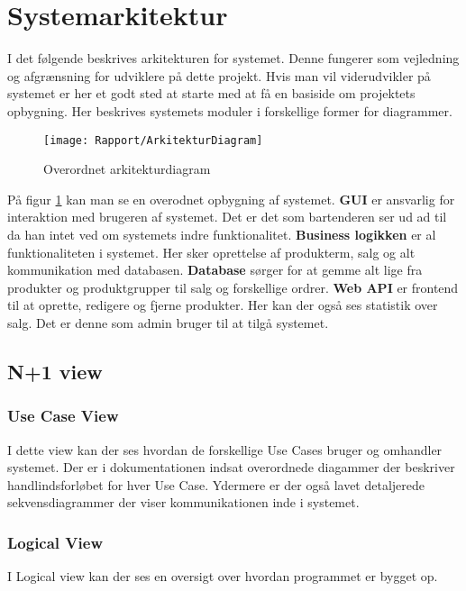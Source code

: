 \section{Systemarkitektur}

I det følgende beskrives arkitekturen for systemet. Denne fungerer som vejledning og afgrænsning for udviklere på dette projekt. Hvis man vil viderudvikler på systemet er her et godt sted at starte med at få en basiside om projektets opbygning.\newline
Her beskrives systemets moduler i forskellige former for diagrammer. 

\begin{figure}[H]
	\centering
	\texttt{[image: Rapport/ArkitekturDiagram]}
	\caption{Overordnet arkitekturdiagram}
	\label{ArkiDia}
\end{figure}

På figur \ref{ArkiDia} kan man se en overodnet opbygning af systemet. \textbf{GUI} er ansvarlig for interaktion med brugeren af systemet. Det er det som bartenderen ser ud ad til da han intet ved om systemets indre funktionalitet.\newline
\textbf{Business logikken} er al funktionaliteten i systemet. Her sker oprettelse af produkterm, salg og alt kommunikation med databasen. 
\textbf{Database} sørger for at gemme alt lige fra produkter og produktgrupper til salg og forskellige ordrer.\newline
\textbf{Web API} er frontend til at oprette, redigere og fjerne produkter. Her kan der også ses statistik over salg. Det er denne som admin bruger til at tilgå systemet. 

\subsection{N+1 view}

\subsubsection{Use Case View}
I dette view kan der ses hvordan de forskellige Use Cases bruger og omhandler systemet. Der er i dokumentationen indsat overordnede diagammer der beskriver handlindsforløbet for hver Use Case. Ydermere er der også lavet detaljerede sekvensdiagrammer der viser kommunikationen inde i systemet. \newline

\subsubsection{Logical View}
I Logical view kan der ses en oversigt over hvordan programmet er bygget op.
 


